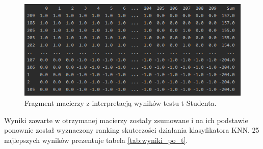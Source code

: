 \documentclass{article}
\begin{document}
\begin{figure}[h]
    \centering
    \noindent 
    \vspace{.2cm}
    \includegraphics[width=14cm]{macierz_210.png}
    \caption{Fragment macierzy z interpretacją wyników testu t-Studenta.}
    \label{fig:macierz_210}
\end{figure}

\newpage

Wyniki zawarte w otrzymanej macierzy zostały zsumowane i na ich podstawie ponownie został wyznaczony ranking skuteczości działania klasyfikatora KNN. 25 najlepszych wyników prezentuje tabela \ref{tab:wyniki_po_t}.
\end{document}
